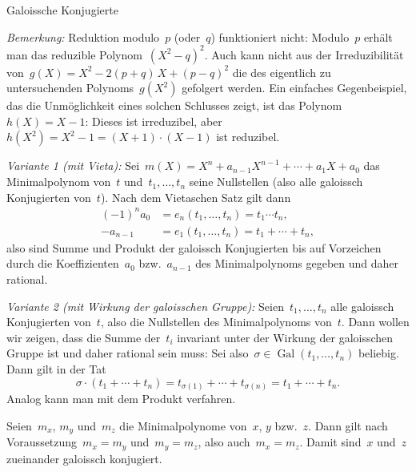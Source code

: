 \documentclass{algblatt}
\begin{document}
\begin{aufgabe}{Galoissche Konjugierte}
\begin{loesungE}
\emph{Bemerkung:} Reduktion modulo~$p$ (oder~$q$) funktioniert nicht:
Modulo~$p$ erhält man das reduzible Polynom~$(X^2 - q)^2$. Auch kann nicht aus
der Irreduzibilität von~$g(X) = X^2 - 2(p+q)\,X + (p-q)^2$ die des eigentlich
zu untersuchenden Polynoms~$g(X^2)$ gefolgert werden. Ein einfaches
Gegenbeispiel, das die Unmöglichkeit eines solchen Schlusses zeigt, ist das
Polynom~$h(X) = X - 1$: Dieses ist irreduzibel, aber~$h(X^2) = X^2 - 1 = (X+1)
\cdot (X-1)$ ist reduzibel.

\item \emph{Variante 1 (mit Vieta):}
Sei~$m(X) = X^n + a_{n-1}X^{n-1} + \cdots + a_1 X + a_0$ das
Minimalpolynom von~$t$ und~$t_1,\ldots,t_n$ seine Nullstellen (also alle
galoissch Konjugierten von~$t$). Nach dem Vietaschen Satz gilt dann
\begin{align*}
  (-1)^n a_0 &= e_n(t_1,\ldots,t_n) = t_1 \cdots t_n, \\
  -a_{n-1} &= e_1(t_1,\ldots,t_n) = t_1 + \cdots + t_n,
\end{align*}
also sind Summe und Produkt der galoissch Konjugierten bis auf Vorzeichen durch
die Koeffizienten~$a_0$ bzw.~$a_{n-1}$ des Minimalpolynoms gegeben und daher
rational.

\emph{Variante 2 (mit Wirkung der galoisschen Gruppe):}
Seien~$t_1,\ldots,t_n$ alle galoissch Konjugierten von~$t$, also die
Nullstellen des Minimalpolynoms von~$t$. Dann wollen wir zeigen, dass die
Summe der~$t_i$ invariant unter der Wirkung der galoisschen Gruppe ist und
daher rational sein muss: Sei also~$\sigma \in
\operatorname{Gal}(t_1,\ldots,t_n)$ beliebig. Dann gilt in der Tat
\[ \sigma \cdot (t_1 + \cdots + t_n) =
  t_{\sigma(1)} + \cdots + t_{\sigma(n)} =
  t_1 + \cdots + t_n. \]
Analog kann man mit dem Produkt verfahren.

\item Seien~$m_x$, $m_y$ und~$m_z$ die Minimalpolynome von~$x$, $y$ bzw.~$z$.
Dann gilt nach Voraussetzung~$m_x = m_y$ und~$m_y = m_z$, also auch~$m_x =
m_z$. Damit sind~$x$ und~$z$ zueinander galoissch konjugiert.
\end{loesungE}
\end{aufgabe}
\end{document}
